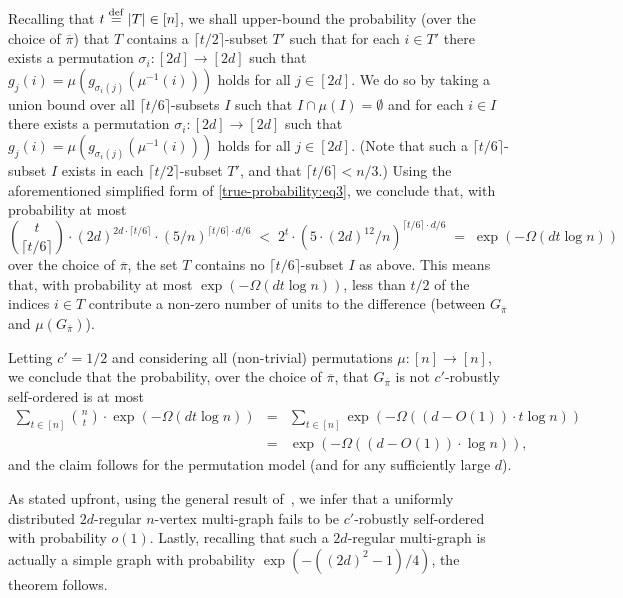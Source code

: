 \documentclass[10pt,a4paper]{article}
\theoremstyle{definition}
\newcommand{\imu}{{\mu^{-1}}}
\newcommand{\ceil}[1]{{\lceil#1\rceil}}
\newcommand{\eqdef}{\stackrel{\rm def}{=}}
\newcommand{\ov}{\overline}
\begin{document}
Recalling that $t\eqdef|T|\in[n]$,
we shall upper-bound the probability (over the choice of $\ov\pi$)
that $T$ contains a $\ceil{t/2}$-subset $T'$
such that for each $i\in T'$ there exists
a permutation $\sigma_i:[2d]\to[2d]$
such that $g_j(i)=\mu(g_{\sigma_i(j)}(\imu(i)))$
holds for all $j\in[2d]$.
We do so by taking a union bound over all $\ceil{t/6}$-subsets $I$
such that $I\cap\mu(I)=\emptyset$
and for each $i\in I$ there exists a permutation $\sigma_i:[2d]\to[2d]$
such that $g_j(i)=\mu(g_{\sigma_i(j)}(\imu(i)))$ holds for all $j\in[2d]$.
(Note that such a $\ceil{t/6}$-subset $I$ exists
in each $\ceil{t/2}$-subset $T'$, and that $\ceil{t/6}<n/3$.)
%
%
Using the aforementioned simplified form of \eqref{true-probability:eq3},
we conclude that, with probability at most
%
$$\binom{t}{\ceil{t/6}}
   \cdot(2d)^{2d\cdot\ceil{t/6}}\cdot(5/n)^{\ceil{t/6}\cdot{d/6}}
   \;<\; 2^t\cdot(5\cdot(2d)^{12}/n)^{\ceil{t/6}\cdot d/6}
   \;=\; \exp(-\Omega(dt\log n))$$
over the choice of $\ov\pi$,
the set $T$ contains no $\ceil{t/6}$-subset $I$ as above.
This means that, with probability at most $\exp(-\Omega(d t\log n))$,
less than ${t/2}$ of the indices $i\in T$ contribute
a non-zero number of units to the difference
(between $G_{\ov \pi}$ and $\mu(G_{\ov \pi})$).


Letting $c'=1/2$ and
considering all (non-trivial) permutations $\mu:[n]\to[n]$,
we conclude that the probability, over the choice of $\ov\pi$,
that $G_{\ov\pi}$ is not $c'$-robustly self-ordered is at most
\begin{eqnarray*}
\sum_{t\in[n]}\binom{n}{t}\cdot\exp(-\Omega(d t\log n))
&=& \sum_{t\in[n]}\exp(-\Omega((d-O(1))\cdot t\log n)) \\
&=& \exp(-\Omega((d-O(1))\cdot \log n)),
\end{eqnarray*}
and the claim follows for the permutation model
(and for any sufficiently large $d$).
%

As stated upfront,
using the general result of~\cite[Thm.~1.3]{GJKW},
%
%
%
%
we infer that a uniformly distributed $2d$-regular $n$-vertex
multi-graph fails to be $c'$-robustly self-ordered with probability $o(1)$.
Lastly, recalling that such a $2d$-regular multi-graph is actually
a simple graph with probability $\exp(-((2d)^2-1)/4)$,
the theorem follows.
%
\EPF
\end{document}
